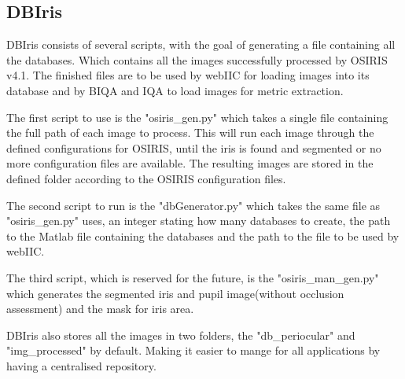 \subsection{DBIris}
\label{sec:dbiris}

DBIris\cite{dbiris} consists of several scripts, with the goal of generating a
file containing all the databases.  Which contains all the images successfully
processed by OSIRIS v4.1\cite{osiris}.  The finished files are to be used by
webIIC for loading images into its database and by BIQA and IQA to load images
for metric extraction.

The first script to use is the "osiris\_gen.py" which takes a single file
containing the full path of each image to process.  This will run each image
through the defined configurations for OSIRIS, until the iris is found and
segmented or no more configuration files are available. The resulting images are stored in
the defined folder according to the OSIRIS configuration files.

The second script to run is the "dbGenerator.py" which takes the same file as
"osiris\_gen.py" uses, an integer stating how many databases to create, the path
to the Matlab file containing the databases and the path to the file to be used
by webIIC.

The third script, which is reserved for the future, is the "osiris\_man\_gen.py"
which generates the segmented iris and pupil image(without occlusion assessment)
and the mask for iris area.

DBIris also stores all the images in two folders, the "db\_periocular" and
"img\_processed" by default.  Making it easier to mange for all applications by
having a centralised repository.




